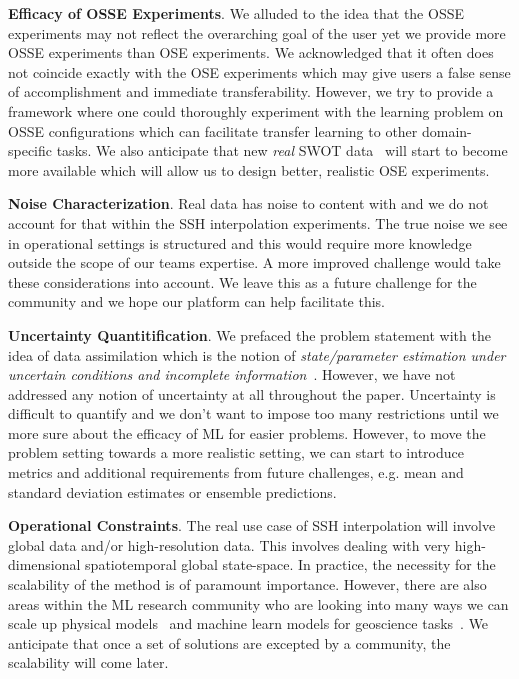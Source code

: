 \textbf{Efficacy of OSSE Experiments}. We alluded to the idea that the OSSE experiments may not reflect the overarching goal of the user yet we provide more OSSE experiments than OSE experiments.
We acknowledged that it often does not coincide exactly with the OSE experiments which may give users a false sense of accomplishment and immediate transferability. 
However, we try to provide a framework where one could thoroughly experiment with the learning problem on OSSE configurations which can facilitate transfer learning to other domain-specific tasks.
We also anticipate that new \textit{real} SWOT data~\cite{SWOT} will start to become more available which will allow us to design better, realistic OSE experiments.

\textbf{Noise Characterization}.
Real data has noise to content with and we do not account for that within the SSH interpolation experiments.
The true noise we see in operational settings is structured and this would require more knowledge outside the scope of our teams expertise.
A more improved challenge would take these considerations into account.
We leave this as a future challenge for the community and we hope our platform can help facilitate this.

\textbf{Uncertainty Quantitification}.
We prefaced the problem statement with the idea of data assimilation which is the notion of \textit{state/parameter estimation under uncertain conditions and incomplete information}~\citep{DAGEOSCIENCE}.
However, we have not addressed any notion of uncertainty at all throughout the paper.
Uncertainty is difficult to quantify and we don't want to impose too many restrictions until we more sure about the efficacy of ML for easier problems.
However, to move the problem setting towards a more realistic setting, we can start to introduce metrics and additional requirements from future challenges, e.g. mean and standard deviation estimates or ensemble predictions.


\textbf{Operational Constraints}.
The real use case of SSH interpolation will involve global data and/or high-resolution data. 
This involves dealing with very high-dimensional spatiotemporal global state-space.
In practice, the necessity for the scalability of the method is of paramount importance.
However, there are also areas within the ML research community who are looking into many ways we can scale up physical models~\citep{VEROS,OCEANANIGANS} and machine learn models for geoscience tasks~\citep{SFNO}.
We anticipate that once a set of solutions are excepted by a community, the scalability will come later.




